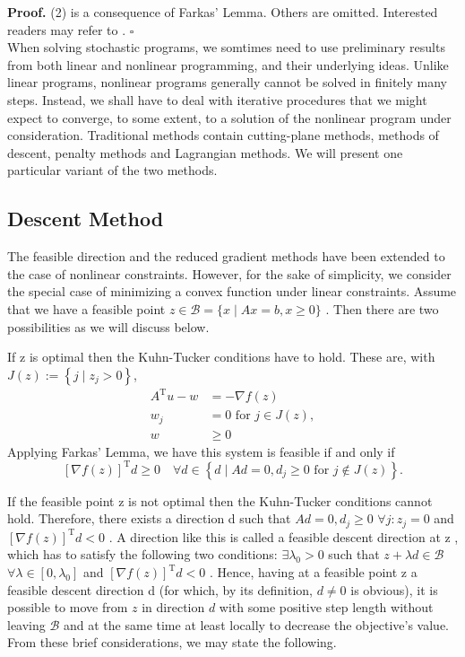\documentclass{article}
\theoremstyle{plain}
\theoremstyle{definition}
\begin{document}
\noindent \textbf{Proof.}  (2) is a consequence of Farkas’ Lemma. Others are omitted. Interested readers may refer to \cite{Stochastic Programming}. 
\hfill $\square$\\

When solving stochastic programs, we somtimes need to use preliminary results from both linear and nonlinear programming, and their underlying ideas. Unlike linear programs, nonlinear programs generally cannot be solved in finitely many steps. Instead, we shall have to deal with iterative procedures that we might expect to converge, to some extent, to a solution of the nonlinear program under consideration. Traditional methods contain cutting-plane methods, methods of descent, penalty methods and Lagrangian methods. We will present one particular variant of the two methods.

\subsection{Descent Method}
The feasible direction and the reduced gradient methods have been extended to the case of nonlinear constraints. However, for the sake of simplicity, we consider the special case of minimizing a convex function under linear constraints. Assume that we have a feasible point  $z \in \mathcal{B}=\{x \mid A x=b, x \geq 0\}$ . Then there are two possibilities as we will discuss below.

If  z  is optimal then the Kuhn-Tucker conditions have to hold. These are, with  $J(z):=\left\{j \mid z_{j}>0\right\}$, 
$$
\begin{aligned}
A^{\mathrm{T}} u-w &=-\nabla f(z) \\
w_{j} &=0 \text { for } j \in J(z), \\
w & \geq 0
\end{aligned}
$$
Applying Farkas' Lemma,  we have this system is feasible if and only if 
$$[\nabla f(z)]^{\mathrm{T}} d \geq 0 \quad \forall d \in\left\{d \mid A d=0, d_{j} \geq 0 \text { for } j \notin J(z)\right\}.$$

If the feasible point  z  is not optimal then the Kuhn-Tucker conditions cannot hold. Therefore, there exists a direction  d  such that  $A d=0, d_{j} \geq 0$ $\forall j: z_{j}=0$  and $ [\nabla f(z)]^{\mathrm{T}} d<0$ . A direction like this is called a feasible descent direction at  z , which has to satisfy the following two conditions: $ \exists \lambda_{0}>0$  such that  $z+\lambda d \in \mathcal{B}$ $\forall \lambda \in\left[0, \lambda_{0}\right]$  and  $[\nabla f(z)]^{\mathrm{T}} d<0$ . Hence, having at a feasible point  z  a feasible descent direction  d  (for which, by its definition,  $d \neq 0$  is obvious), it is possible to move from  $z$  in direction $ d$  with some positive step length without leaving  $\mathcal{B}$  and at the same time at least locally to decrease the objective's value. From these brief considerations, we may state the following.
\end{document}
